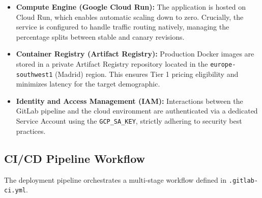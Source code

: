 \documentclass[a4paper,12pt]{report}
\begin{document}
\begin{itemize}
    \item \textbf{Compute Engine (Google Cloud Run):} The application is hosted on Cloud Run, which enables automatic scaling down to zero. Crucially, the service is configured to handle traffic routing natively, managing the percentage splits between stable and canary revisions.
    \item \textbf{Container Registry (Artifact Registry):} Production Docker images are stored in a private Artifact Registry repository located in the \texttt{europe-southwest1} (Madrid) region. This ensures Tier 1 pricing eligibility and minimizes latency for the target demographic.
    \item \textbf{Identity and Access Management (IAM):} Interactions between the GitLab pipeline and the cloud environment are authenticated via a dedicated Service Account using the \texttt{GCP\_SA\_KEY}, strictly adhering to security best practices.
\end{itemize}

\subsection{CI/CD Pipeline Workflow}
The deployment pipeline orchestrates a multi-stage workflow defined in \texttt{.gitlab-ci.yml}.
\end{document}
